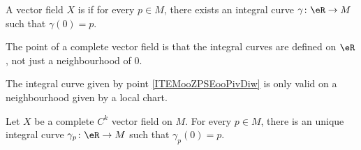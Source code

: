 \begin{definition}  \label{DEFooMZSBooFkfKkS}
	A vector field \( X\) is  if for every \( p\in M\), there exists an integral curve \( \gamma\colon \eR\to M\) such that \( \gamma(0)=p\).
\end{definition}

The point of a complete vector field is that the integral curves are defined on \( \eR\), not just a neighbourhood of \( 0\).

The integral curve given by point \ref{ITEMooZPSEooPivDiw} is only valid on a neighbourhood given by a local chart.


\begin{proposition}      \label{PROPooQNWOooBOxYtu}
	Let \( X\) be a complete \( C^k\) vector field on \( M\). For every \( p\in M\), there is an unique integral curve \( \gamma_p\colon \eR\to M\) such that \( \gamma_p(0)=p\).
\end{proposition}

